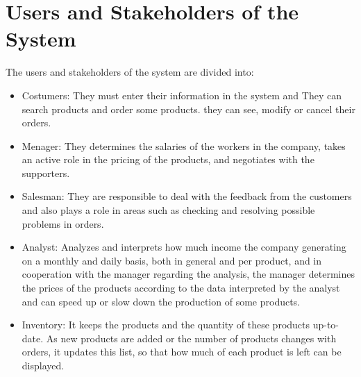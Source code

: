 \section{Users and Stakeholders of the System}
The users and stakeholders of the system are divided into:
\begin{itemize}
	\item Costumers: They must enter their information in the system and They can search products and order some products. they can see, modify or cancel their orders.
	\item Menager: They determines the salaries of the workers in the company, takes an active role in the pricing of the products, and negotiates with the supporters.
	\item Salesman: They are responsible to deal with the feedback from the customers and also plays a role in areas such as checking and resolving possible problems in orders.
	\item Analyst: Analyzes and interprets how much income the company generating on a monthly and daily basis, both in general and per product, and in cooperation with the manager regarding the analysis, the manager determines the prices of the products according to the data interpreted by the analyst and can speed up or slow down the production of some products.
	\item Inventory: It keeps the products and the quantity of these products up-to-date. As new products are added or the number of products changes with orders, it updates this list, so that how much of each product is left can be displayed.
\end{itemize}